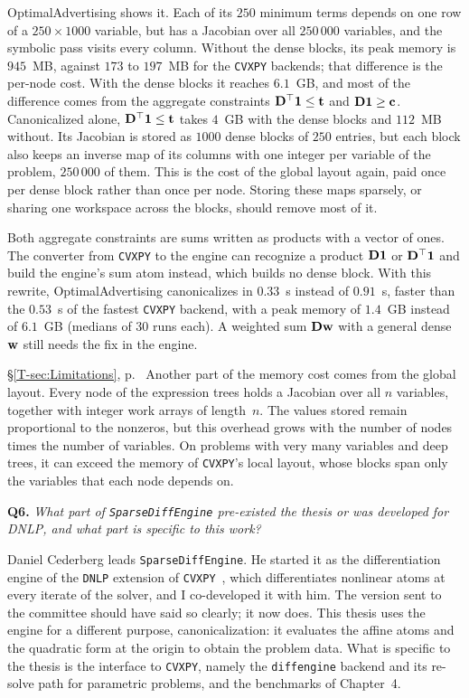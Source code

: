 \documentclass[letterpaper,12pt]{article}
\newcommand{\tsec}[1]{\S\ref{T-#1}}
\newcommand{\tpage}[1]{p.~\pageref{T-#1}}
\newcommand{\tref}[1]{\tsec{#1}, \tpage{#1}}
\newcommand{\question}[2]{\FloatBarrier\par\bigskip\textbf{Q#1.} \emph{#2}\par}
\begin{document}
OptimalAdvertising shows it. Each of its $250$ minimum terms depends on one row of a
$250 \times 1000$ variable, but has a Jacobian over all $250\,000$ variables, and the symbolic
pass visits every column. Without the dense blocks, its peak memory is $945$~MB, against $173$ to
$197$~MB for the \texttt{CVXPY} backends; that difference is the per-node cost. With the dense
blocks it reaches $6.1$~GB, and most of the difference comes from the aggregate constraints
$\mathbf{D}^\top \mathbf 1 \le \mathbf{t}$ and $\mathbf{D} \mathbf 1 \ge \mathbf{c}$. Canonicalized alone,
$\mathbf{D}^\top \mathbf 1 \le \mathbf{t}$ takes $4$~GB with the dense blocks and $112$~MB without. Its
Jacobian is stored as $1000$ dense blocks of $250$ entries, but each block also keeps an inverse
map of its columns with one integer per variable of the problem, $250\,000$ of them. This is
the cost of the global layout again, paid once per dense block rather than once per node.
Storing these maps sparsely, or sharing one workspace across the blocks, should remove most of
it.

Both aggregate constraints are sums written as products with a vector of ones. The converter
from \texttt{CVXPY} to the engine can recognize a product $\mathbf{D}\mathbf 1$ or
$\mathbf{D}^\top\mathbf 1$ and build the engine's sum atom instead, which builds no dense block. With
this rewrite, OptimalAdvertising canonicalizes in $0.33$~s instead of $0.91$~s, faster than the
$0.53$~s of the fastest \texttt{CVXPY} backend, with a peak memory of $1.4$~GB instead of
$6.1$~GB (medians of $30$ runs each). A weighted sum $\mathbf{D}\mathbf{w}$ with a general dense
$\mathbf{w}$ still needs the fix in the engine.

\begin{thesisquote}{\tref{sec:Limitations}}
Another part of the memory cost comes from the global layout. Every node of the expression trees
holds a Jacobian over all $n$ variables, together with integer work arrays of length~$n$. The
values stored remain proportional to the nonzeros, but this overhead grows with the number of
nodes times the number of variables. On problems with very many variables and deep trees, it
can exceed the memory of \texttt{CVXPY}'s local layout, whose blocks span only the variables
that each node depends on.
\end{thesisquote}

\question{6}{What part of \texttt{SparseDiffEngine} pre-existed the thesis or was developed for
DNLP, and what part is specific to this work?}
Daniel Cederberg leads \texttt{SparseDiffEngine}. He started it as the differentiation engine
of the \texttt{DNLP} extension of \texttt{CVXPY}~\cite{cederberg2025disciplined}, which
differentiates nonlinear atoms at every iterate of the solver, and I co-developed it with him.
The version sent to the committee should have said so clearly; it
now does. This thesis uses the engine for a different
purpose, canonicalization: it evaluates the affine atoms and the quadratic form at the origin to
obtain the problem data. What is specific to the thesis is the interface to \texttt{CVXPY},
namely the \texttt{diffengine} backend and its re-solve path for parametric problems, and the
benchmarks of Chapter~4.
\end{document}
